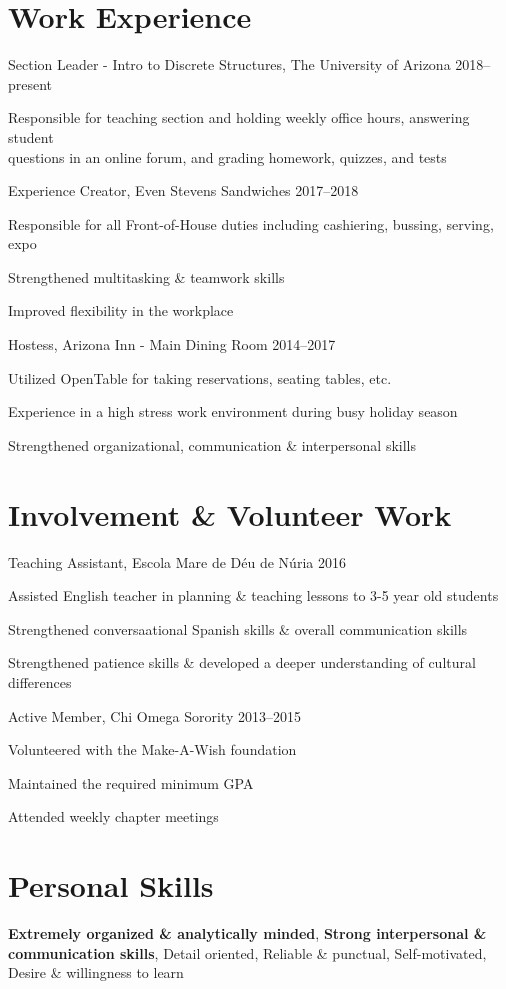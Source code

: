\documentclass[]{friggeri-cv} %
\begin{document}
\section{Work Experience}
\begin{entrylist}

\entry%
{Section Leader - Intro to Discrete Structures{\normalfont , The University of Arizona}}%
{2018--present}
{%
	\item{Responsible for teaching section and holding weekly office hours, answering student \\ questions in an online forum, and grading homework, quizzes, and tests}
}
\entry
{Experience Creator{\normalfont , Even Stevens Sandwiches}}
{2017--2018}
{%
	\item{Responsible for all Front-of-House duties including cashiering, bussing, serving, expo}
	\item{Strengthened multitasking \& teamwork skills}
	\item{Improved flexibility in the workplace}
}
\entry
{Hostess{\normalfont , Arizona Inn - Main Dining Room}}
{2014--2017}
{%
		\item{Utilized OpenTable for taking reservations, seating tables, etc.}
		\item{Experience in a high stress work environment during busy holiday season}
		\item{Strengthened organizational, communication \& interpersonal skills}%
}


\end{entrylist}

\section{Involvement \& Volunteer Work}
\begin{entrylist}
\entry
{Teaching Assistant{\normalfont , Escola Mare de D\'{e}u de N\'{u}ria}}
{2016}
{
	\item{Assisted English teacher in planning \& teaching lessons to 3-5 year old students}
	\item{Strengthened conversaational Spanish skills \& overall communication skills}
	\item{Strengthened patience skills \& developed a deeper understanding of cultural differences}
}
\entry
{Active Member{\normalfont , Chi Omega Sorority}}
{2013--2015}
{
	\item{Volunteered with the Make-A-Wish foundation}
	\item{Maintained the required minimum GPA}
	\item{Attended weekly chapter meetings}
}
\end{entrylist}

\section{Personal Skills}
\begin{entrylist}
\lineentry
{}{}
{\textbf{Extremely organized \& analytically minded}, \textbf{Strong interpersonal \& communication skills},
Detail oriented, Reliable \& punctual, Self-motivated, Desire \& willingness to learn}
\end{entrylist}%
\end{document}
